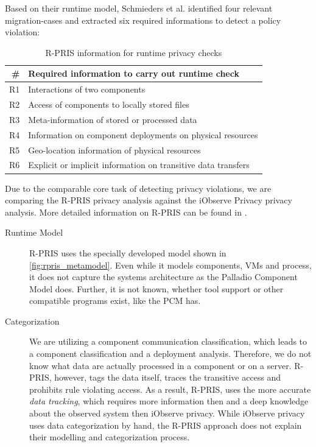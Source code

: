 Based on their runtime model, Schmieders et al. identified four relevant migration-cases and extracted six required informations to detect a policy violation\cite{Schmieders.2015}:

\begin{table}[h]
	\centering
	\begin{tabular}{r | l}
		\hline
		\textbf{\#} & \textbf{Required information to carry out runtime check}\\
		\hline
		R1 & Interactions of two components\\
		R2 & Access of components to locally stored files\\
		R3 & Meta-information of stored or processed data\\
		R4 & Information on component deployments on physical resources \\
		R5 & Geo-location information of physical resources\\
		R6 & Explicit or implicit information on transitive data transfers\\
		\hline
	\end{tabular}
	\caption{R-PRIS information for runtime privacy checks \cite{Schmieders.2015}}
	\label{tab:rpris_information}
\end{table}


Due to the comparable core task of detecting privacy violations, we are comparing the R-PRIS privacy analysis against the iObserve Privacy privacy analysis. More detailed information on R-PRIS can be found in \cite{Schmieders.}\cite{Schmieders.2015}.

\begin{description}
	\item[Runtime Model] R-PRIS uses the specially developed model shown in \autoref{fig:rpris_metamodel}. Even while it models components, VMs and process, it does not capture the systems architecture as the Palladio Component Model does. Further, it is not known, whether tool support or other compatible programs exist, like the PCM has. 
\end{description}

\begin{description}
	\item[Categorization] We are utilizing a component communication classification, which leads to a component classification and a deployment analysis. Therefore, we do not know what data are actually processed in a component or on a server. R-PRIS, however, tags the data itself, traces the transitive access and prohibits rule violating access. As a result, R-PRIS, uses the more accurate \textit{data tracking}, which requires more information then and a deep knowledge about the observed system then iObserve privacy. While iObserve privacy uses data categorization by hand, the R-PRIS approach does not explain their modelling and categorization process.
\end{description}

